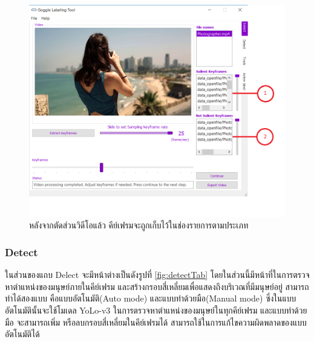 \begin{figure}[!ht]
    \centering
    \includegraphics[width=1\textwidth]{chapter3/images/3_6/SelectTab_sampled.png}
    \caption{หลังจากตัดส่วนวิดีโอแล้ว คีย์เฟรมจะถูกเก็บไว้ในช่องรายการตามประเภท}
    \label{fig:SelectTab_sampled}
\end{figure}
\clearpage
\subsubsection{Detect}
ในส่วนของแถบ Delect จะมีหน้าต่างเป็นดังรูปที่ \ref{fig:detectTab} โดยในส่วนนี้มีหน้าที่ในการตรวจหาตำแหน่งของมนุษย์ภายในคีย์เฟรม
และสร้างกรอบสี่เหลี่ยมเพื่อแสดงถึงบริเวณที่มีมนุษย์อยู่ สามารถทำได้สองแบบ 
คือแบบอัตโนมัติ(Auto mode) และแบบทำด้วยมือ(Manual mode) 
ซึ่งในแบบอัตโนมัตินั้นจะใช้โมเดล YoLo-v3 ในการตรวจหาตำแหน่งของมนุษย์ในทุกคีย์เฟรม
และแบบทำด้วยมือ จะสามารถเพิ่ม หรือลบกรอบสี่เหลี่ยมในคีย์เฟรมได้ สามารถใช้ในการแก้ไขความผิดพลาดของแบบอัตโนมัติได้

